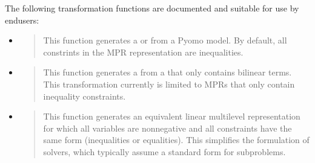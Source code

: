 \documentclass[letterpaper,10pt,english]{sphinxmanual}
\begin{document}
The following transformation functions are documented and suitable for use by end\sphinxhyphen{}users:
\begin{itemize}
\item {} 
{\hyperref[\detokenize{reference/pyomo:pao.pyomo.convert.convert_pyomo2MultilevelProblem}]{}}
\begin{quote}

This function generates a {\hyperref[\detokenize{reference/mpr:pao.mpr.repn.LinearMultilevelProblem}]{}} or
{\hyperref[\detokenize{reference/mpr:pao.mpr.repn.QuadraticMultilevelProblem}]{}} from a Pyomo model.  By default,
all constrints in the MPR representation are inequalities.
\end{quote}

\item {} 
{\hyperref[\detokenize{reference/mpr:pao.mpr.convert_repn.linearize_bilinear_terms}]{}}
\begin{quote}

This function generates a {\hyperref[\detokenize{reference/mpr:pao.mpr.repn.LinearMultilevelProblem}]{}} from a {\hyperref[\detokenize{reference/mpr:pao.mpr.repn.QuadraticMultilevelProblem}]{}}
that only contains bilinear terms.  This transformation currently is limited to
MPRs that only contain inequality constraints.
\end{quote}

\item {} 
{\hyperref[\detokenize{reference/mpr:pao.mpr.convert_repn.convert_to_standard_form}]{}}
\begin{quote}

This function generates an equivalent linear multilevel representation for which all
variables are non\sphinxhyphen{}negative and all constraints have the same form (inequalities or equalities).
This simplifies the formulation of solvers, which typically assume a standard form
for subproblems.
\end{quote}

\end{itemize}
\end{document}

